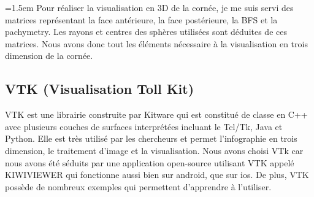 \documentclass[a4paper,12pt]{article}
\begin{document}
\vspace{0.25cm}
\parindent=1.5em
 Pour réaliser la visualisation en 3D de la cornée, je me suis servi des matrices représentant la face antérieure, la face postérieure, la BFS et la pachymetry. Les rayons et centres des sphères utilisées sont déduites de ces matrices. Nous avons donc tout les éléments nécessaire à la visualisation en trois dimension de la cornée.

	\subsection{VTK (Visualisation Toll Kit)}
	VTK est une librairie construite par Kitware qui est constitué de classe en C++ avec plusieurs couches de surfaces interprétées incluant le Tcl/Tk, Java et Python. Elle est très utilisé par les chercheurs et permet l'infographie en trois dimension, le traitement d'image et la visualisation. Nous avons choisi VTk car nous avons été séduits par une application open-source utilisant VTK appelé KIWIVIEWER qui fonctionne aussi bien sur android, que sur ios. De plus, VTK possède de nombreux exemples qui permettent d'apprendre à l'utiliser.
	
\end{document}

